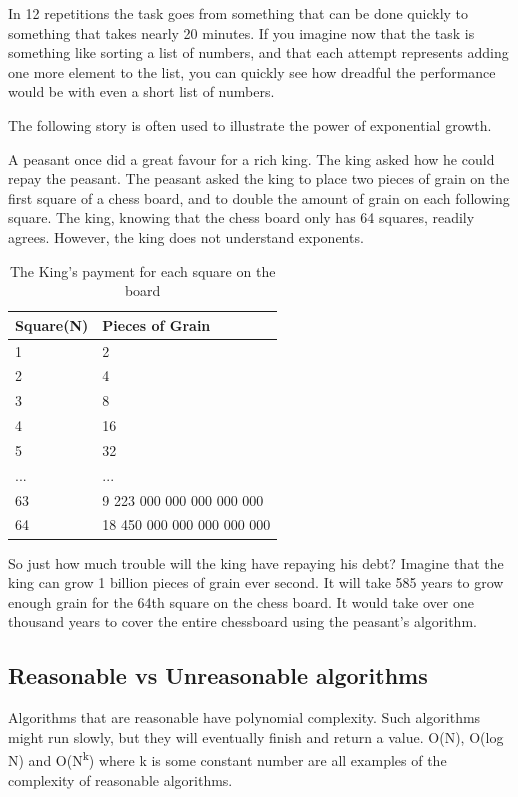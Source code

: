 In 12 repetitions the task goes from something that can be done quickly to something that takes nearly 20 minutes.    If you imagine now that the task is something like sorting a list of numbers,  and that each attempt represents adding one more element to the list,  you can quickly see how dreadful the performance would be with even a short list of numbers.

The following story is often used to illustrate the power of exponential growth.

A peasant once did a great favour for a rich king.  The king asked how he could repay the peasant.   The peasant asked the king to place two pieces of grain on the first square of a chess board, and to double the amount of grain on each following square. The king, knowing that the chess board only has 64 squares, readily agrees.   However, the king does not understand exponents.

\begin{table}[H]
\caption{The King's payment for each square on the board}

\begin{tabular}{l|l}
Square(N)&Pieces of Grain\\\hline\hline
1&2\\
2&4\\
3&8\\
4&16\\
5&32\\
...&...\\
63 & 9 223 000 000 000 000 000\\
64 & 18 450 000 000 000 000 000\\
\end{tabular}
\end{table}

So just how much trouble will the king have repaying his debt?   Imagine that the king can grow 1 billion pieces of grain ever second.   It will take 585 years to grow enough grain for the 64th square on the chess board.   It would take over one thousand years to cover the entire chessboard using the peasant's algorithm.

\subsection{Reasonable vs Unreasonable algorithms}

Algorithms that are reasonable have polynomial complexity.   Such algorithms might run slowly, but they will eventually finish and return a value.
O(N), O(log N) and O(N\textsuperscript{k})  where k is some constant number are all examples of the complexity of reasonable algorithms.

